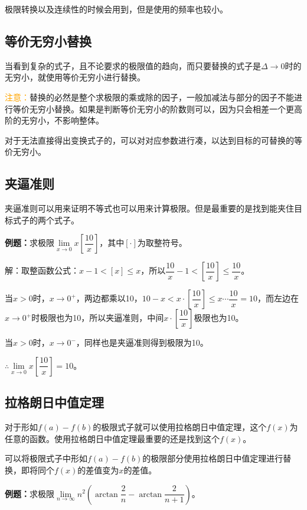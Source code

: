 极限转换以及连续性的时候会用到，但是使用的频率也较小。

\subsection{等价无穷小替换}

当看到复杂的式子，且不论要求的极限值的趋向，而只要替换的式子是$\Delta\to 0$时的无穷小，就使用等价无穷小进行替换。

\textcolor{orange}{注意：}替换的必然是整个求极限的乘或除的因子，一般加减法与部分的因子不能进行等价无穷小替换。如果是判断等价无穷小的阶数则可以，因为只会相差一个更高阶的无穷小，不影响整体。

对于无法直接得出变换式子的，可以对对应参数进行凑，以达到目标的可替换的等价无穷小。

\subsection{夹逼准则}

夹逼准则可以用来证明不等式也可以用来计算极限。但是最重要的是找到能夹住目标式子的两个式子。\medskip

\textbf{例题：}求极限$\lim\limits_{x\to 0}x\left[\dfrac{10}{x}\right]$，其中$[\cdot]$为取整符号。

解：取整函数公式：$x-1<[x]\leqslant x$，所以$\dfrac{10}{x}-1<\left[\dfrac{10}{x}\right]\leqslant\dfrac{10}{x}$。

当$x>0$时，$x\to 0^+$，两边都乘以10，$10-x<x\cdot\left[\dfrac{10}{x}\right]\leqslant x\cdots\dfrac{10}{x}=10$，而左边在$x\to 0^+$时极限也为10，所以夹逼准则，中间$x\cdot\left[\dfrac{10}{x}\right]$极限也为10。\medskip

当$x>0$时，$x\to 0^-$，同样也是夹逼准则得到极限为10。\medskip

$\therefore \lim\limits_{x\to 0}x\left[\dfrac{10}{x}\right]=10$。

\subsection{拉格朗日中值定理}

对于形如$f(a)-f(b)$的极限式子就可以使用拉格朗日中值定理，这个$f(x)$为任意的函数。使用拉格朗日中值定理最重要的还是找到这个$f(x)$。

可以将极限式子中形如$f(a)-f(b)$的极限部分使用拉格朗日中值定理进行替换，即将同个$f(x)$的差值变为$x$的差值。

\textbf{例题：}求极限$\lim\limits_{n\to\infty}n^2\left(\arctan\dfrac{2}{n}-\arctan\dfrac{2}{n+1}\right)$。\medskip

